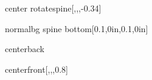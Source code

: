 \documentclass[
marklength=0in,
12pt,
pagecolor=background,
]{bookcover}
\newcommand{\hebtitle}{
}
\newcommand{\engtitle}{
}
\newcommand{\setspineheight}{
}
\newcommand{\hebtext}[1]{
	\begin{hebrew}
		#1
	\end{hebrew}
}
\begin{document}
	\begin{bookcover}
		\begin{bookcoverelement}{center rotate}{spine}[,,,-0.34\coverheight]
			\textcolor{text}{\setspineheight\hebtext{\hebtitle} \space \engtitle }
		\end{bookcoverelement}
		\begin{bookcoverelement}{normal}{bg spine bottom}[0.1\spinewidth,0in,0.1\spinewidth,0in]
		\end{bookcoverelement}
		
		\begin{bookcoverelement}{center}{back}
			\begin{Huge}
				\textcolor{text}{\hebtext{\hebtitle}}
				\textcolor{text}{\engtitle}
			\end{Huge}
			\vspace{2\baselineskip}
			\begin{large}
			\end{large}
		\end{bookcoverelement}
		\begin{bookcoverelement}{center}{front}[,,,0.8\coverheight]
			\textcolor{text}{
		}
		\end{bookcoverelement}
	\end{bookcover}
\end{document}
